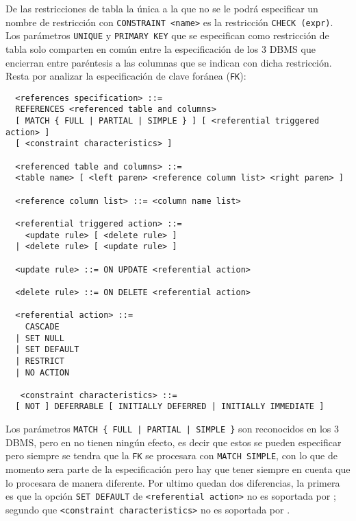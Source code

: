 De las restricciones de tabla la única a la que no se le podrá especificar un nombre de restricción con \verb=CONSTRAINT <name>= es la restricción \verb=CHECK (expr)=. Los parámetros \verb=UNIQUE= y \verb=PRIMARY KEY= que se especifican como restricción de tabla solo comparten en común entre la especificación de los 3 DBMS que encierran entre paréntesis a las columnas que se indican con dicha restricción. Resta por analizar la especificación de clave foránea (\verb=FK=):    

\begin{Verbatim}
  <references specification> ::=
  REFERENCES <referenced table and columns>
  [ MATCH { FULL | PARTIAL | SIMPLE } ] [ <referential triggered action> ]
  [ <constraint characteristics> ]

  <referenced table and columns> ::=
  <table name> [ <left paren> <reference column list> <right paren> ]

  <reference column list> ::= <column name list>

  <referential triggered action> ::=
    <update rule> [ <delete rule> ]
  | <delete rule> [ <update rule> ]

  <update rule> ::= ON UPDATE <referential action>

  <delete rule> ::= ON DELETE <referential action>

  <referential action> ::=
    CASCADE
  | SET NULL
  | SET DEFAULT
  | RESTRICT
  | NO ACTION

   <constraint characteristics> ::=
  [ NOT ] DEFERRABLE [ INITIALLY DEFERRED | INITIALLY IMMEDIATE ]
\end{Verbatim}
Los parámetros \verb=MATCH { FULL | PARTIAL | SIMPLE }= son reconocidos en los 3 DBMS, pero en \s no tienen ningún efecto, es decir que estos se pueden especificar pero siempre se tendra que la \verb=FK= se procesara con \verb=MATCH SIMPLE=, con lo que de momento sera parte de la especificación pero hay que tener siempre en cuenta que \s lo procesara de manera diferente. Por ultimo quedan dos diferencias, la primera es que la opción \verb=SET DEFAULT= de \verb=<referential action>= no es soportada por \m; segundo que \verb=<constraint characteristics>= no es soportada por \m.\\




